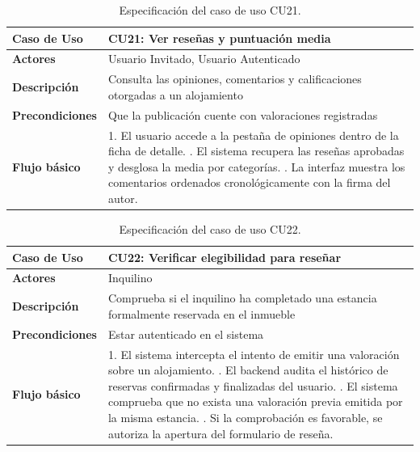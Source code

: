 \begin{table}[H]
\centering
\begin{tabular}{|p{3.1cm}|p{10.9cm}|}
\hline
\textbf{Caso de Uso} & \textbf{CU21: Ver reseñas y puntuación media} \\ \hline
\textbf{Actores} & Usuario Invitado, Usuario Autenticado \\ \hline
\textbf{Descripción} & Consulta las opiniones, comentarios y calificaciones otorgadas a un alojamiento \\ \hline
\textbf{Precondiciones} & Que la publicación cuente con valoraciones registradas \\ \hline
\textbf{Flujo básico} & 
1. El usuario accede a la pestaña de opiniones dentro de la ficha de detalle. \newline
2. El sistema recupera las reseñas aprobadas y desglosa la media por categorías. \newline
3. La interfaz muestra los comentarios ordenados cronológicamente con la firma del autor. \\ \hline
\end{tabular}
\caption{Especificación del caso de uso CU21.}
\label{tab:cu21}
\end{table}

\begin{table}[H]
\centering
\begin{tabular}{|p{3.1cm}|p{10.9cm}|}
\hline
\textbf{Caso de Uso} & \textbf{CU22: Verificar elegibilidad para reseñar} \\ \hline
\textbf{Actores} & Inquilino \\ \hline
\textbf{Descripción} & Comprueba si el inquilino ha completado una estancia formalmente reservada en el inmueble \\ \hline
\textbf{Precondiciones} & Estar autenticado en el sistema \\ \hline
\textbf{Flujo básico} & 
1. El sistema intercepta el intento de emitir una valoración sobre un alojamiento. \newline
2. El backend audita el histórico de reservas confirmadas y finalizadas del usuario. \newline
3. El sistema comprueba que no exista una valoración previa emitida por la misma estancia. \newline
4. Si la comprobación es favorable, se autoriza la apertura del formulario de reseña. \\ \hline
\end{tabular}
\caption{Especificación del caso de uso CU22.}
\label{tab:cu22}
\end{table}

